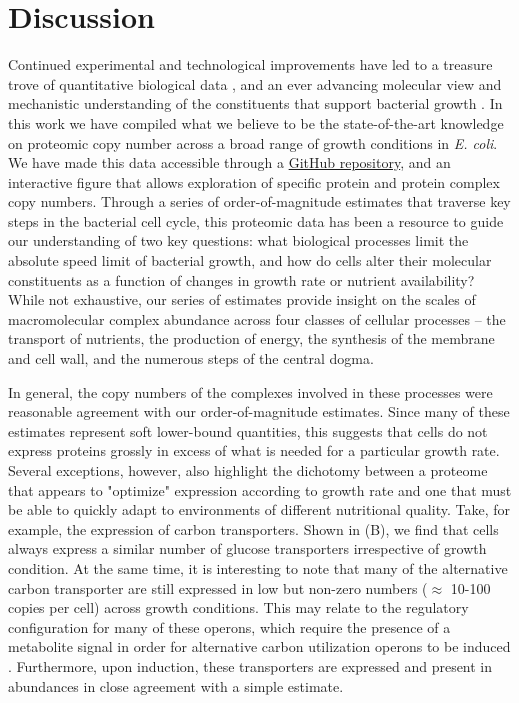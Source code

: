 \section{Discussion}
Continued experimental and technological improvements have led to a treasure
trove of quantitative biological data \citep{hui2015, schmidt2016, si2017,
gallagher2020, peebo2015, valgepea2013}, and an ever advancing molecular view
and mechanistic understanding of the constituents that support bacterial
growth \citep{taheriaraghi2015, morgenstein2015, si2019, karr2012,
kostinski2020}. In this work we have compiled what we believe to be the
state-of-the-art knowledge on proteomic copy number across a broad range of
growth conditions in \textit{E. coli}. We have made this data accessible
through a \href{https://github.com/RPGroup-PBoC/growth_limits}{GitHub
repository}, and an interactive figure that allows exploration of specific
protein and protein complex copy numbers. Through a series of
order-of-magnitude estimates that traverse key steps in the bacterial cell
cycle, this proteomic data has been a resource to guide our understanding of
two key questions: what biological processes limit the absolute speed limit
of bacterial growth, and how do cells alter their molecular constituents as a
function of changes in growth rate or nutrient availability? While not
exhaustive, our series of estimates provide insight on the scales of
macromolecular complex abundance across four classes of cellular processes --
the transport of nutrients, the production of energy, the synthesis of the
membrane and cell wall, and the numerous steps of the central dogma.

In general, the copy numbers of the complexes involved in these processes were
reasonable agreement with our order-of-magnitude estimates. Since many of these
estimates represent soft lower-bound quantities, this suggests that cells do not
express proteins grossly in excess of what is needed for a particular growth
rate. Several exceptions, however, also highlight the dichotomy between a
proteome that appears to "optimize" expression according to growth rate and one
that must be able to quickly adapt to environments of different nutritional
quality. Take, for example, the expression of carbon transporters. Shown in
(B), we find that cells always express a similar number of
glucose transporters irrespective of growth condition. At the same time, it is
interesting to note that many of the alternative carbon transporter are still
expressed in low but non-zero numbers ($\approx$ 10-100 copies per cell) across
growth conditions. This may relate to the regulatory configuration for many of
these operons, which require the presence of a metabolite signal in order for
alternative carbon utilization operons to be induced \citep{monod1949,
laxhuber2020}. Furthermore, upon induction, these transporters are expressed and
present in abundances in close agreement with a simple estimate.

